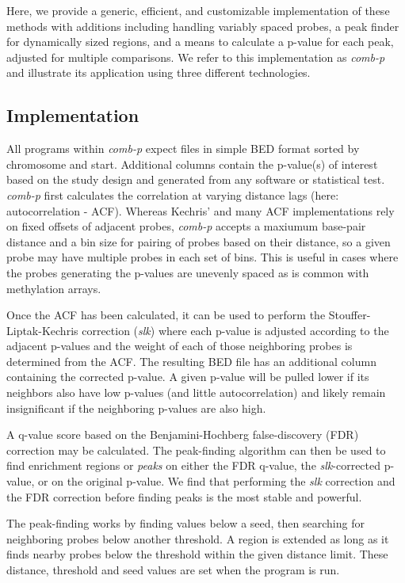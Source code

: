 \documentclass{bioinfo}
\begin{document}
Here, we provide a generic, efficient, and customizable implementation
of these methods with additions including handling variably spaced
probes, a peak finder for dynamically sized regions, and a means to
calculate a p-value for each peak, adjusted for multiple
comparisons. We refer to this implementation as \textit{comb-p} and
illustrate its application using three different technologies.

\begin{methods}

\section{Implementation}

All programs within \textit{comb-p} expect files in simple BED format
\citep{Kent2002} sorted by chromosome and start.
Additional columns contain the p-value(s) of interest based on the
study design and generated from any software or statistical test.
\textit{comb-p} first
calculates the correlation at varying distance lags (here: autocorrelation - ACF).
 Whereas Kechris'
\citep{Kechris2010} and many ACF implementations rely on fixed offsets
of adjacent probes, \textit{comb-p} accepts a maxiumum base-pair
distance and a bin size for pairing of probes based on their distance,
so a given probe may have multiple probes in each set of
bins. This is useful in cases where the probes generating the p-values
are unevenly spaced as is common with methylation arrays.

Once the ACF has been calculated, it can be used to perform the
Stouffer-Liptak-Kechris correction (\textit{slk}) where each p-value is
adjusted according to the adjacent p-values and the weight of each of
those neighboring probes is determined from the ACF. The resulting BED file
has an additional column containing the corrected p-value.
A given p-value will be pulled lower if its neighbors also have low
p-values (and little autocorrelation) and likely remain insignificant if the
neighboring p-values are also high.

A q-value score based on the Benjamini-Hochberg false-discovery (FDR)
correction may be calculated. The peak-finding algorithm can then be
used to find enrichment regions or \textit{peaks} on either the FDR
q-value, the \textit{slk}-corrected p-value, or on the original
p-value.  We find that performing the \textit{slk} correction and the
FDR correction before finding peaks is the most stable and
powerful.

The peak-finding works by finding values below a seed, then searching
for neighboring probes below another threshold. A region is extended
as long as it finds nearby probes below the threshold within the given
distance limit. These distance, threshold and seed values are set when
the program is run.


\end{methods}
\end{document}
